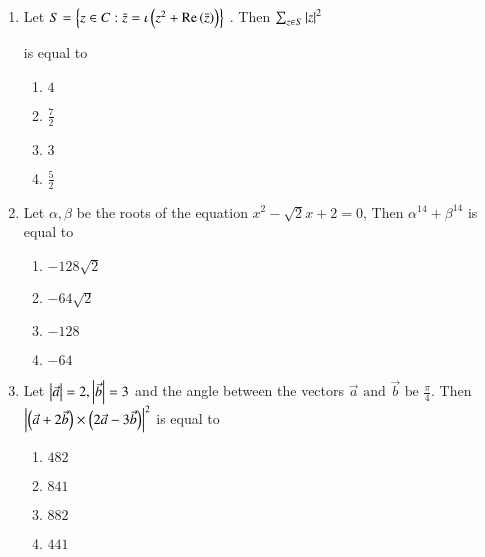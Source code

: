 \documentclass[journal]{IEEEtran}
\theoremstyle{remark}
\begin{document}
\begin{enumerate}
\begin{multicols}{4}
\begin{enumerate}
\item $\brak{\sim p}\lor\brak{\sim q}$
\item $\brak{\sim p}\land\brak{\sim q}$
\item $p \lor\brak{\sim q}$
\item $p \lor q$
\end{enumerate}
\end{multicols}

\item Let $S=\left\{z \in C:\Bar{z}=\iota\left(z^2+\text{Re}\left(\Bar{z}\right)\right)\right\}$ . Then $\sum_{z\in S}^{} {\left\vert z\right\vert}^2$

is equal to 

\begin{multicols}{4}
\begin{enumerate}
\item $4$
\item $\frac{7}{2}$
\item $3$
\item $\frac{5}{2}$
\end{enumerate}
\end{multicols}

\item Let $\alpha , \beta$ be the roots of the equation $x^2- \sqrt{2}x+2=0$, Then $\alpha^{14}+\beta^{14}$ is equal to

\begin{multicols}{4}
\begin{enumerate}
\item $-128\sqrt{2}$
\item $-64\sqrt{2}$
\item $-128$
\item $-64$
\end{enumerate}
\end{multicols}

\item Let $\left\vert\Vec{a}\right\vert=2,\left\vert\Vec{b}\right\vert=3$ and the angle between the vectors $\Vec{a} \text{ and } \Vec{b} \text{ be } \frac{\pi}{4}$. Then ${\left\vert\left(\Vec{a}+2\Vec{b}\right)\times\left(2\Vec{a}-3\Vec{b}\right)\right\vert}^2$ is equal to

\begin{multicols}{4}
\begin{enumerate}
\item $482$
\item $841$
\item $882$
\item $441$
\end{enumerate}
\end{multicols}


\end{enumerate}
\end{document}
